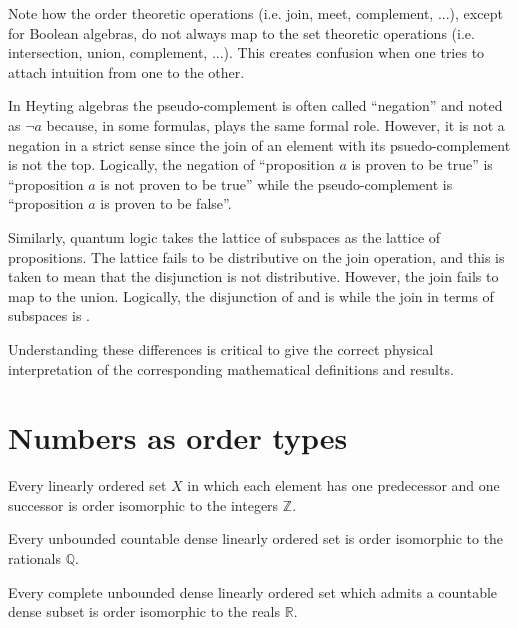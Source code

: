 \documentclass{article}
\begin{document}
\begin{remark}
	Note how the order theoretic operations (i.e. join, meet, complement, ...), except for Boolean algebras, do not always map to the set theoretic operations (i.e. intersection, union, complement, ...). This creates confusion when one tries to attach intuition from one to the other.	
	
	In Heyting algebras the pseudo-complement is often called ``negation'' and noted as $\neg a$ because, in some formulas, plays the same formal role. However, it is not a negation in a strict sense since the join of an element with its psuedo-complement is not the top. Logically, the negation of ``proposition $a$ is proven to be true'' is ``proposition $a$ is not proven to be true'' while the pseudo-complement is ``proposition $a$ is proven to be false''.
	
	Similarly, quantum logic takes the lattice of subspaces as the lattice of propositions. The lattice fails to be distributive on the join operation, and this is taken to mean that the disjunction is not distributive. However, the join fails to map to the union. Logically, the disjunction of  and  is  while the join in terms of subspaces is .
	
	Understanding these differences is critical to give the correct physical interpretation of the corresponding mathematical definitions and results.
	
\end{remark}

\section{Numbers as order types}

\begin{prop}
	Every linearly ordered set $X$ in which each element has one predecessor and one successor is order isomorphic to the integers $\mathbb{Z}$.
\end{prop}

\begin{prop}
	 Every unbounded countable dense linearly ordered set is order isomorphic to the rationals $\mathbb{Q}$.
\end{prop}

\begin{prop}
	Every complete unbounded dense linearly ordered set which admits a countable dense subset is order isomorphic to the reals $\mathbb{R}$.
\end{prop}
\end{document}
